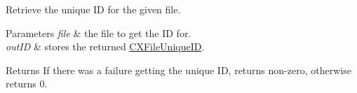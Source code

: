 Retrieve the unique ID for the given {\ttfamily file}. 


\begin{DoxyParams}{Parameters}
{\em file} & the file to get the ID for. \\
\hline
{\em out\+ID} & stores the returned \mbox{\hyperlink{structCXFileUniqueID}{C\+X\+File\+Unique\+ID}}. \\
\hline
\end{DoxyParams}
\begin{DoxyReturn}{Returns}
If there was a failure getting the unique ID, returns non-\/zero, otherwise returns 0. 
\end{DoxyReturn}

